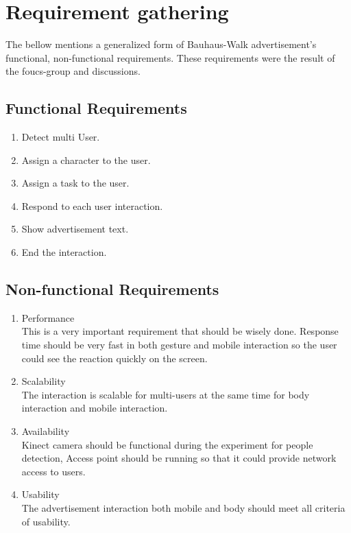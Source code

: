 \section{Requirement gathering}
The bellow mentions a generalized form of Bauhaus-Walk advertisement's functional, non-functional requirements. These requirements were the result of the foucs-group and discussions.

\subsection{Functional Requirements}

\begin{enumerate}
\item	Detect multi User.
\item	Assign a character to the user. 
\item	Assign a task to the user.
\item	Respond to each user interaction.
\item	Show advertisement text.
\item	End the interaction.
\end{enumerate}


\subsection{Non-functional Requirements}

\begin{enumerate}
\item	Performance \\
This is a very important requirement that should be wisely done. Response time should be very fast in both gesture and mobile interaction so the user could see the reaction quickly on the screen. 

\item	Scalability \\
The interaction is scalable for multi-users at the same time for body interaction and mobile interaction.

\item	Availability \\
Kinect camera should be functional during the experiment for people detection, Access point should be running so that it could provide network access to users.

\item	Usability \\
The advertisement interaction both mobile and body should meet all criteria of usability.
\end{enumerate}


